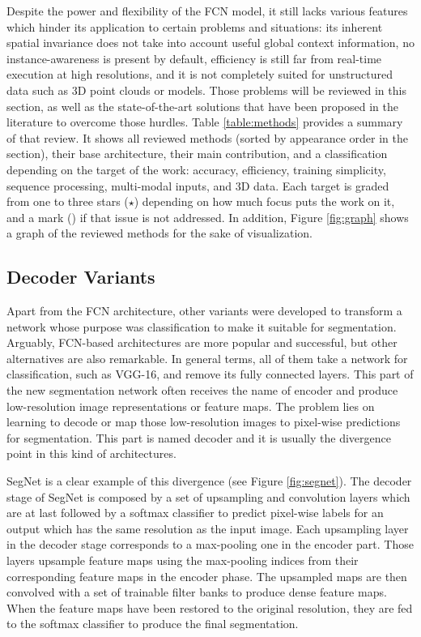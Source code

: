 Despite the power and flexibility of the \acs{FCN} model, it still lacks various features which hinder its application to certain problems and situations: its inherent spatial invariance does not take into account useful global context information, no instance-awareness is present by default, efficiency is still far from real-time execution at high resolutions, and it is not completely suited for unstructured data such as \acs{3D} point clouds or models. Those problems will be reviewed in this section, as well as the state-of-the-art solutions that have been proposed in the literature to overcome those hurdles. Table \ref{table:methods} provides a summary of that review. It shows all reviewed methods (sorted by appearance order in the section), their base architecture, their main contribution, and a classification depending on the target of the work: accuracy, efficiency, training simplicity, sequence processing, multi-modal inputs, and \acs{3D} data. Each target is graded from one to three stars ($\star$) depending on how much focus puts the work on it, and a mark (\xmark) if that issue is not addressed. In addition, Figure \ref{fig:graph} shows a graph of the reviewed methods for the sake of visualization.

\subsection{Decoder Variants}

Apart from the \acs{FCN} architecture, other variants were developed to transform a network whose purpose was classification to make it suitable for segmentation. Arguably, \acs{FCN}-based architectures are more popular and successful, but other alternatives are also remarkable. In general terms, all of them take a network for classification, such as \acs{VGG}-16, and remove its fully connected layers. This part of the new segmentation network often receives the name of encoder and produce low-resolution image representations or feature maps. The problem lies on learning to decode or map those low-resolution images to pixel-wise predictions for segmentation. This part is named decoder and it is usually the divergence point in this kind of architectures.

SegNet\cite{Badrinarayanan2015} is a clear example of this divergence (see Figure \ref{fig:segnet}). The decoder stage of SegNet is composed by a set of upsampling and convolution layers which are at last followed by a softmax classifier to predict pixel-wise labels for an output which has the same resolution as the input image. Each upsampling layer in the decoder stage corresponds to a max-pooling one in the encoder part. Those layers upsample feature maps using the max-pooling indices from their corresponding feature maps in the encoder phase. The upsampled maps are then convolved with a set of trainable filter banks to produce dense feature maps. When the feature maps have been restored to the original resolution, they are fed to the softmax classifier to produce the final segmentation.

